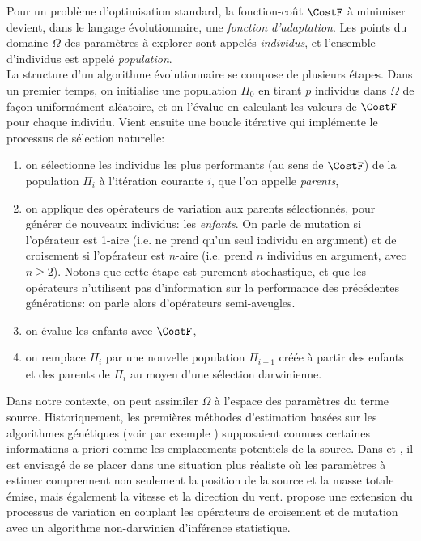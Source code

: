  Pour un problème d'optimisation standard, la fonction-coût $\CostF$ à minimiser devient, dans le langage évolutionnaire, une \textit{fonction d'adaptation}. Les points du domaine $\Omega$ des paramètres à explorer sont appelés \textit{individus}, et l'ensemble d'individus est appelé \textit{population}. \\
 
 La structure d'un algorithme évolutionnaire se compose de plusieurs étapes. Dans un premier temps, on initialise une population $\Pi_0$ en tirant $p$ individus dans $\Omega$ de façon uniformément aléatoire, et on l'évalue en calculant les valeurs de $\CostF$ pour chaque individu. Vient ensuite une boucle itérative qui implémente le processus de sélection naturelle:
 \begin{enumerate}
 	\item on sélectionne les individus les plus performants (au sens de $\CostF$) de la population $\Pi_i$ à l'itération courante $i$, que l'on appelle \textit{parents},
 	\item on applique des opérateurs de variation aux parents sélectionnés, pour générer de nouveaux individus: les \textit{enfants}. On parle de mutation si l'opérateur est 1-aire (i.e. ne prend qu'un seul individu en argument) et de croisement si l'opérateur est $n$-aire (i.e. prend $n$ individus en argument, avec $n \geq 2$). Notons que cette étape est purement stochastique, et que les opérateurs n'utilisent pas d'information sur la performance des précédentes générations: on parle alors d'opérateurs semi-aveugles.
 	\item on évalue les enfants avec $\CostF$,
 	\item on remplace $\Pi_i$  par une nouvelle population $\Pi_{i+1}$ créée à partir des enfants et des parents de $\Pi_i$ au moyen d'une sélection darwinienne.\\
 \end{enumerate}
 
 Dans notre contexte, on peut assimiler $\Omega$ à l'espace des paramètres du terme source. Historiquement, les premières méthodes d'estimation basées sur les algorithmes génétiques (voir par exemple \cite{Haupt2005}) supposaient connues certaines informations a priori comme les emplacements potentiels de la source. Dans \cite{Allen2007} et \cite{Haupt2007}, il est envisagé de se placer dans une situation plus réaliste où les paramètres à estimer comprennent non seulement la position de la source et la masse totale émise, mais également la vitesse et la direction du vent. \cite{Cervone2011} propose une extension du processus de variation en couplant les opérateurs de croisement et de mutation avec un algorithme non-darwinien d'inférence statistique.\\ 
 
